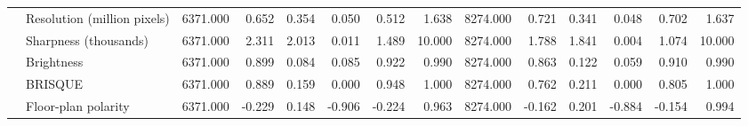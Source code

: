 \begin{tabular}{llrrrrrrrrrrrr}
 & Resolution (million pixels) & 6371.000 & 0.652 & 0.354 & 0.050 & 0.512 & 1.638 & 8274.000 & 0.721 & 0.341 & 0.048 & 0.702 & 1.637 \\
 & Sharpness (thousands) & 6371.000 & 2.311 & 2.013 & 0.011 & 1.489 & 10.000 & 8274.000 & 1.788 & 1.841 & 0.004 & 1.074 & 10.000 \\
 & Brightness & 6371.000 & 0.899 & 0.084 & 0.085 & 0.922 & 0.990 & 8274.000 & 0.863 & 0.122 & 0.059 & 0.910 & 0.990 \\
 & BRISQUE & 6371.000 & 0.889 & 0.159 & 0.000 & 0.948 & 1.000 & 8274.000 & 0.762 & 0.211 & 0.000 & 0.805 & 1.000 \\
 & Floor-plan polarity & 6371.000 & -0.229 & 0.148 & -0.906 & -0.224 & 0.963 & 8274.000 & -0.162 & 0.201 & -0.884 & -0.154 & 0.994 \\
\cline{1-14}
\bottomrule
\end{tabular}
